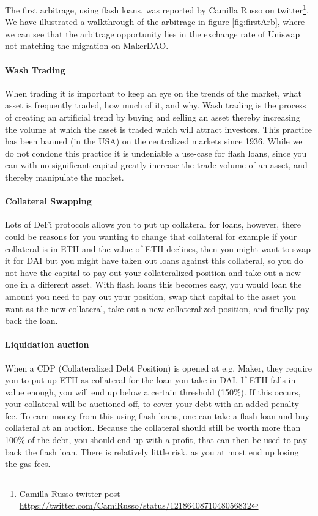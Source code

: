 The first arbitrage, using flash loans, was reported by Camilla Russo
on twitter\footnote{Camilla Russo twitter post
  \url{https://twitter.com/CamiRusso/status/1218640871048056832}}. We
have illustrated a walkthrough of the arbitrage in figure
\ref{fig:firstArb}, where we can see that the arbitrage opportunity
lies in the exchange rate of Uniswap not matching the migration on
MakerDAO.

\paragraph{Wash Trading} When trading it is important to keep an eye
on the trends of the market, what asset is frequently traded, how much
of it, and why. Wash trading is the process of creating an artificial
trend by buying and selling an asset thereby increasing the volume at
which the asset is traded which will attract investors. This practice
has been banned (in the USA) on the centralized markets since
1936. While we do not condone this practice it is undeniable a
use-case for flash loans, since you can with no significant capital greatly
increase the trade volume of an asset, and thereby manipulate the
market.

\paragraph{Collateral Swapping} Lots of DeFi protocols allows you to
put up collateral for loans, however, there could be reasons for you
wanting to change that collateral for example if your collateral is in
ETH and the value of ETH declines, then you might want to swap it for
DAI but you might have taken out loans against this collateral, so you
do not have the capital to pay out your collateralized position and
take out a new one in a different asset. With flash loans this becomes
easy, you would loan the amount you need to pay out your position, swap
that capital to the asset you want as the new collateral, take out a
new collateralized position, and finally pay back the loan.

\paragraph{Liquidation auction} When a CDP (Collateralized Debt Position) is
opened at e.g. Maker, they require you to put up ETH as collateral for the loan
you take in DAI. If ETH falls in value enough, you will end up below a certain
threshold (150\%). If this occurs, your collateral will be auctioned off, to
cover your debt with an added penalty fee. To earn money from this
using flash loans, one can take a flash loan and buy collateral at an auction.
Because the collateral should still be worth more than 100\% of the debt, you
should end up with a profit, that can then be used to pay back the flash loan.
There is relatively little risk, as you at most end up losing the gas fees.
